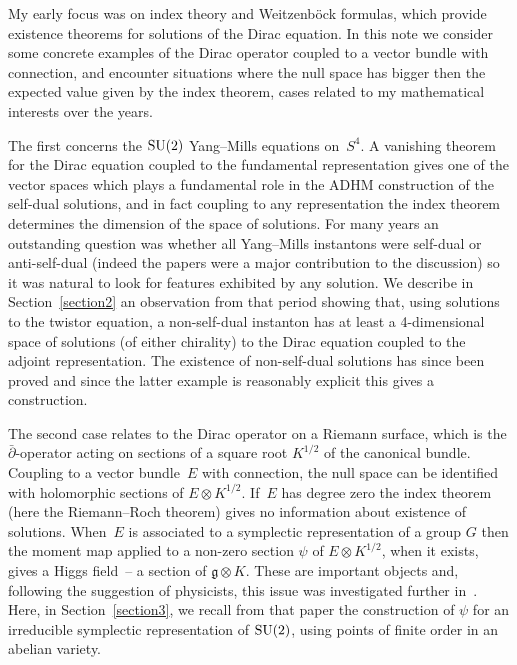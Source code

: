 \documentclass[pdftex]{sigma}
\newcommand{\lie}[1]{\mathfrak{#1}}
\begin{document}
My early focus was on index theory and Weitzenb\"ock formulas, which provide existence theorems for solutions of the Dirac equation. In this note we consider some concrete examples of the Dirac operator coupled to a vector bundle with connection, and encounter situations where the null space has bigger then the expected value given by the index theorem, cases related to my mathematical interests over the years.

The first concerns the ${\rm SU}(2)$ Yang--Mills equations on~$S^4$. A vanishing theorem for the Dirac equation coupled to the fundamental representation gives one of the vector spaces which plays a fundamental role in the ADHM construction of the self-dual solutions, and in fact coupling to any representation the index theorem determines the dimension of the space of solutions. For many years an outstanding question was whether all Yang--Mills instantons were self-dual or anti-self-dual (indeed the papers \cite{BourguignonJ/LawsonH, BourguignonJ/LawsonH/SimonsJ} were a major contribution to the discussion) so it was natural to look for features exhibited by any solution. We describe in Section~\ref{section2} an observation from that period showing that, using solutions to the twistor equation, a non-self-dual instanton has at least a 4-dimensional space of solutions (of either chirality) to the Dirac equation coupled to the adjoint representation. The existence of non-self-dual solutions has since been proved \cite{SadunL/SegertJ, SibnerL/SibnerR/UhlenbeckK} and since the latter example is reasonably explicit this gives a construction.

The second case relates to the Dirac operator on a Riemann surface, which is the $\bar\partial$-operator acting on sections of a square root $K^{1/2}$ of the canonical bundle. Coupling to a vector bundle~$E$ with connection, the null space can be identified with holomorphic sections of $E\otimes K^{1/2}$. If~$E$ has degree zero the index theorem (here the Riemann--Roch theorem) gives no information about existence of solutions. When~$E$ is associated to a symplectic representation of a group $G$ then the moment map applied to a non-zero section $\psi$ of $E\otimes K^{1/2}$, when it exists, gives a Higgs field~-- a section of $\lie{g}\otimes K$. These are important objects and, following the suggestion of physicists, this issue was investigated further in~\cite{Hitchin2}. Here, in Section~\ref{section3}, we recall from that paper the construction of $\psi$ for an irreducible symplectic representation of ${\rm SU}(2)$, using points of finite order in an abelian variety.
\end{document}
